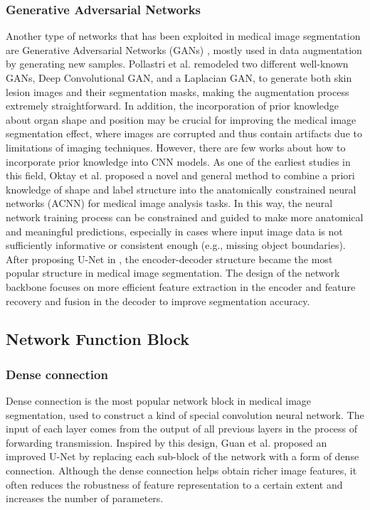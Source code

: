 \subsubsection{Generative Adversarial Networks}
\label{subsubsec:gan}
Another type of networks that has been exploited in medical image segmentation
are Generative Adversarial Networks (GANs) \cite{goodfellow2020gan}, mostly used
in data augmentation by generating new samples. Pollastri et al.
\cite{pollastri2020gan} remodeled two different well-known GANs, Deep
Convolutional GAN, and a Laplacian GAN, to generate both skin lesion images and
their segmentation masks, making the augmentation process extremely
straightforward.
In addition, the incorporation of prior knowledge about organ shape and position
may be crucial for improving the medical image segmentation effect, where images
are corrupted and thus contain artifacts due to limitations of imaging
techniques. However, there are few works about how to incorporate prior
knowledge into CNN models. As one of the earliest studies in this field, Oktay
et al. \cite{oktay2017acnn} proposed a novel and general method to combine a
priori knowledge of shape and label structure into the anatomically constrained
neural networks (ACNN) for medical image analysis tasks. In this way, the neural
network training process can be constrained and guided to make more anatomical
and meaningful predictions, especially in cases where input image data is not
sufficiently informative or consistent enough (e.g., missing object
boundaries).\\

After proposing U-Net in \cite{ronneberger2015unet}, the encoder-decoder
structure became the most popular structure in medical image segmentation. The
design of the network backbone focuses on more efficient feature extraction in
the encoder and feature recovery and fusion in the decoder to improve
segmentation accuracy.

\subsection{Network Function Block}
\subsubsection{Dense connection}
Dense connection is the most popular network block in medical image
segmentation, used to construct a kind of special convolution neural network.
The input of each layer comes from the output of all previous layers in the
process of forwarding transmission. Inspired by this design, Guan et al.
\cite{guan2019fully} proposed an improved U-Net by replacing each sub-block of
the network with a form of dense connection. Although the dense connection helps
obtain richer image features, it often reduces the robustness of feature
representation to a certain extent and increases the number of parameters.

